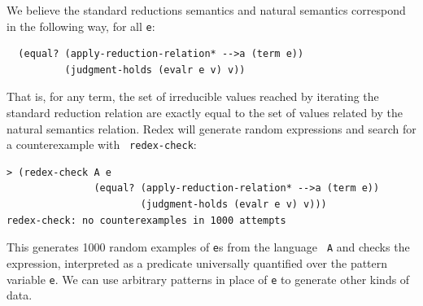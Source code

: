 We believe the standard reductions semantics and natural semantics
correspond in the following way, for all {\tt e}:
\begin{verbatim}
  (equal? (apply-reduction-relation* -->a (term e))
          (judgment-holds (evalr e v) v))
\end{verbatim}
That is, for any term, the set of irreducible values reached by
iterating the standard reduction relation are exactly equal to the set
of values related by the natural semantics relation.  Redex will
generate random expressions and search for a counterexample with {\tt
  redex-check}:
\begin{verbatim}                                                                          
> (redex-check A e
               (equal? (apply-reduction-relation* -->a (term e))
                       (judgment-holds (evalr e v) v)))
redex-check: no counterexamples in 1000 attempts
\end{verbatim}
This generates 1000 random examples of {\tt e}s from the language {\tt
  A} and checks the expression, interpreted as a predicate universally
quantified over the pattern variable {\tt e}.  We can use arbitrary
patterns in place of {\tt e} to generate other kinds of data.
